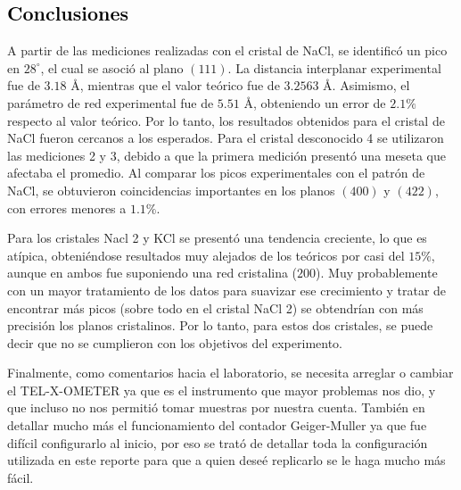 \textcolor{black}{\section{Conclusiones}}

\noindent A partir de las mediciones realizadas con el cristal de NaCl, se identificó un pico en $28^\circ$, el cual se asoció al plano $(111)$. La distancia interplanar experimental fue de $3.18$ \AA{}, mientras que el valor teórico fue de $3.2563$ \AA{}. Asimismo, el parámetro de red experimental fue de $5.51$ \AA{}, obteniendo un error de $2.1\%$ respecto al valor teórico. Por lo tanto, los resultados obtenidos para el cristal de NaCl fueron cercanos a los esperados. Para el cristal desconocido 4 se utilizaron las mediciones 2 y 3, debido a que la primera medición presentó una meseta que afectaba el promedio. Al comparar los picos experimentales con el patrón de NaCl, se obtuvieron coincidencias importantes en los planos $(400)$ y $(422)$, con errores menores a $1.1\%$. 

Para los cristales Nacl 2 y KCl se presentó una tendencia creciente, lo que es atípica, obteniéndose resultados muy alejados de los teóricos por casi del $15\%$, aunque en ambos fue suponiendo una red cristalina ($200$). Muy probablemente con un mayor tratamiento de los datos para suavizar ese crecimiento y tratar de encontrar más picos (sobre todo en el cristal NaCl 2) se obtendrían con más precisión los planos cristalinos. Por lo tanto, para estos dos cristales, se puede decir que no se cumplieron con los objetivos del experimento.

Finalmente, como comentarios hacia el laboratorio, se necesita arreglar o cambiar el TEL-X-OMETER ya que es el instrumento que mayor problemas nos dio, y que incluso no nos permitió tomar muestras por nuestra cuenta. También en detallar mucho más el funcionamiento del contador Geiger-Muller ya que fue difícil configurarlo al inicio, por eso se trató de detallar toda la configuración utilizada en este reporte para que a quien deseé replicarlo se le haga mucho más fácil.